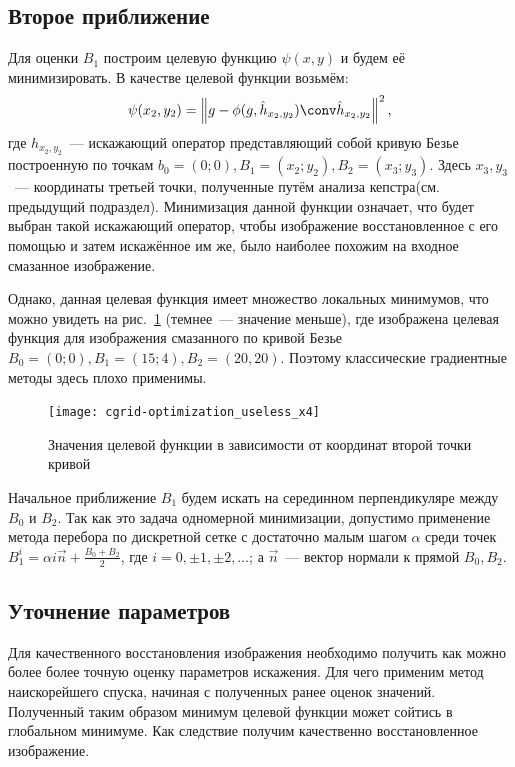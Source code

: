 \subsection{Второе приближение}
Для оценки $B_1$ построим целевую функцию $\psi(x,y)$ и будем её минимизировать. В качестве целевой функции возьмём:
\begin{equation}\label{eq:costFunction}
	\psi(x_2,y_2) = \left\|g - \phi(g, \hat{h}_{x_2,y_2}) \conv \hat{h}_{x_2,y_2}\right\|^2,
\end{equation}
где $h_{x_2,y_2}$~--- искажающий оператор представляющий собой кривую Безье построенную по точкам $b_0=(0;0), B_1=(x_2;y_2), B_2=(x_3;y_3)$. Здесь $x_3, y_3$~--- координаты третьей точки, полученные путём анализа кепстра(см. предыдущий подраздел). Минимизация данной функции означает, что будет выбран такой искажающий оператор, чтобы изображение восстановленное с его помощью и затем искажённое им же, было наиболее похожим на входное смазанное изображение.

Однако, данная целевая функция имеет множество локальных минимумов, что можно увидеть на рис.~\ref{fig:costFunctionGrid} (темнее~--- значение меньше), где изображена целевая функция для изображения смазанного по кривой Безье $B_0=(0;0), B_1=(15;4), B_2=(20, 20)$. Поэтому классические градиентные методы здесь плохо применимы.
\begin{figure}[h!]
	\centering\texttt{[image: cgrid-optimization\_useless\_x4]}
	\caption{Значения целевой функции в зависимости от координат второй точки кривой}
	\label{fig:costFunctionGrid}
\end{figure}

Начальное приближение $B_1$ будем искать на серединном перпендикуляре между $B_0$ и $B_2$. Так как это задача одномерной минимизации, допустимо применение метода перебора по дискретной сетке с достаточно малым шагом $\alpha$ среди точек $B_1^i = \alpha i \vec{n}+\frac{B_0+B_2}{2}$, где $i = 0, \pm 1, \pm 2, \dots$; а $\vec{n}$~--- вектор нормали к прямой $B_0,B_2$.

\subsection{Уточнение параметров}
Для качественного восстановления изображения необходимо получить как можно более более точную оценку параметров искажения. Для чего применим метод наискорейшего спуска, начиная с полученных ранее оценок значений. Полученный таким образом минимум целевой функции может сойтись в глобальном минимуме. Как следствие получим качественно восстановленное изображение.

